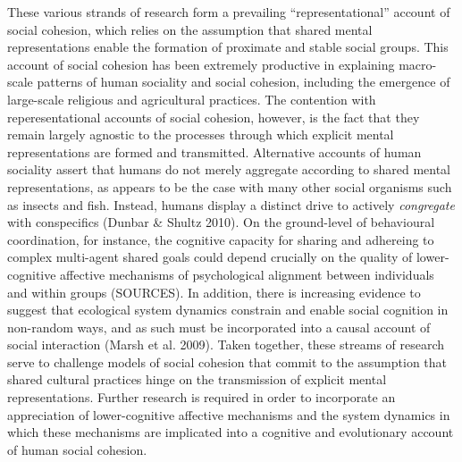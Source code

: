 \documentclass[12pt]{report}
\begin{document}
These various strands of research form a prevailing ``representational'' account of social cohesion, which relies on the assumption that shared mental representations enable the formation of proximate and stable social groups.  This account of social cohesion has been extremely productive in explaining macro-scale patterns of human sociality and social cohesion, including the emergence of large-scale religious and agricultural practices.  The contention with reperesentational accounts of social cohesion, however, is the fact that they remain largely agnostic to the processes through which explicit mental representations are formed and transmitted. Alternative accounts of human sociality assert that humans do not merely aggregate according to shared mental representations, as appears to be the case with many other social organisms such as insects and fish. Instead, humans display a distinct drive to actively \textit{congregate} with conspecifics (Dunbar & Shultz 2010).  On the ground-level of behavioural coordination, for instance, the cognitive capacity for sharing and adhereing to complex multi-agent shared goals could depend crucially on the quality of lower-cognitive affective mechanisms of psychological alignment between individuals and within groups (SOURCES).  In addition, there is increasing evidence to suggest that ecological system dynamics constrain and enable social cognition in non-random ways, and as such must be incorporated into a causal account of social interaction (Marsh et al. 2009).  Taken together, these streams of research serve to challenge models of social cohesion that commit to the assumption that shared cultural practices hinge on the transmission of explicit mental representations. Further research is required in order to incorporate an appreciation of lower-cognitive affective mechanisms and the system dynamics in which these mechanisms are implicated into a cognitive and evolutionary account of human social cohesion.
\end{document}
